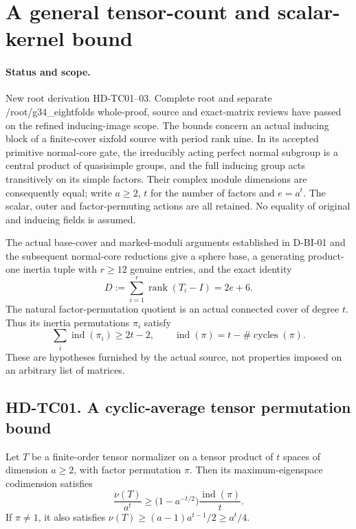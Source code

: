 \section{A general tensor-count and scalar-kernel bound}
\label{sec:tensor-count-scalar-bound}

\paragraph{Status and scope.}
New root derivation HD-TC01--03. Complete root and separate
/root/g34\_eightfolds whole-proof, source and exact-matrix reviews
have passed on the refined inducing-image scope. The bounds concern an actual inducing block of
a finite-cover sixfold source with period rank nine. In its
accepted primitive normal-core gate, the irreducibly acting
perfect normal subgroup is a central product of quasisimple
groups, and the full inducing group acts transitively on its
simple factors. Their complex module dimensions are consequently
equal; write $a\ge2$, $t$ for the number of factors and $e=a^t$.
The scalar, outer and factor-permuting actions are all retained.
No equality of original and inducing fields is assumed.

The actual base-cover and marked-moduli arguments established in
D-BI-01 and the subsequent normal-core reductions give a sphere
base, a generating product-one inertia tuple with $r\ge12$
genuine entries, and the exact identity
\[
              D:=\sum_{i=1}^r\operatorname{rank}(T_i-I)
                           =2e+6.                       \tag{TC.1}
\]
The natural factor-permutation quotient is an actual connected
cover of degree $t$. Thus its inertia permutations $\pi_i$ satisfy
\[
          \sum_i\operatorname{ind}(\pi_i)\ge2t-2,
 \qquad\operatorname{ind}(\pi)=t-\#\operatorname{cycles}(\pi).
                                                               \tag{TC.2}
\]
These are hypotheses furnished by the actual source, not
properties imposed on an arbitrary list of matrices.

\subsection*{HD-TC01. A cyclic-average tensor permutation bound}

\begin{lemma}[HD-TC01]
Let $T$ be a finite-order tensor normalizer on a tensor product
of $t$ spaces of dimension $a\ge2$, with factor permutation $\pi$.
Then its maximum-eigenspace codimension satisfies
\[
 \frac{\nu(T)}{a^t}\ge
       \bigl(1-a^{-t/2}\bigr)\frac{\operatorname{ind}(\pi)}t.
                                                               \tag{TC.3}
\]
If $\pi\ne1$, it also satisfies
$\nu(T)\ge(a-1)a^{t-1}/2\ge a^t/4$.
\end{lemma}

